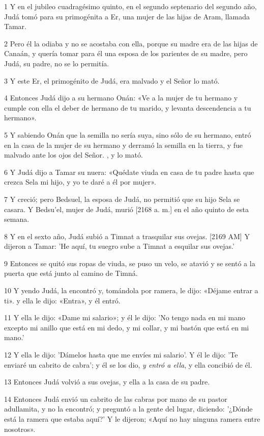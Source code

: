 \par 1 Y en el jubileo cuadragésimo quinto, en el segundo septenario del segundo año, Judá tomó para su primogénita a Er, una mujer de las hijas de Aram, llamada Tamar.
\par 2 Pero él la odiaba y no se acostaba con ella, porque su madre era de las hijas de Canaán, y quería tomar para él una esposa de los parientes de su madre, pero Judá, su padre, no se lo permitía.
\par 3 Y este Er, el primogénito de Judá, era malvado y el Señor lo mató.
\par 4 Entonces Judá dijo a su hermano Onán: «Ve a la mujer de tu hermano y cumple con ella el deber de hermano de tu marido, y levanta descendencia a tu hermano».
\par 5 Y sabiendo Onán que la semilla no sería suya, sino sólo de su hermano, entró en la casa de la mujer de su hermano y derramó la semilla en la tierra, y fue malvado ante los ojos del Señor. , y lo mató.
\par 6 Y Judá dijo a Tamar su nuera: «Quédate viuda en casa de tu padre hasta que crezca Sela mi hijo, y yo te daré a él por mujer».
\par 7 Y creció; pero Bedsuel, la esposa de Judá, no permitió que su hijo Sela se casara. Y Bedsu'el, mujer de Judá, murió [2168 a. m.] en el año quinto de esta semana.
\par 8 Y en el sexto año, Judá subió a Timnat a trasquilar sus ovejas. [2169 AM] Y dijeron a Tamar: 'He aquí, tu suegro sube a Timnat a esquilar sus ovejas.'
\par 9 Entonces se quitó sus ropas de viuda, se puso un velo, se atavió y se sentó a la puerta que está junto al camino de Timná.
\par 10 Y yendo Judá, la encontró y, tomándola por ramera, le dijo: «Déjame entrar a ti». y ella le dijo: «Entra», y él entró.
\par 11 Y ella le dijo: «Dame mi salario»; y él le dijo: 'No tengo nada en mi mano excepto mi anillo que está en mi dedo, y mi collar, y mi bastón que está en mi mano.'
\par 12 Y ella le dijo: 'Dámelos hasta que me envíes mi salario'. Y él le dijo: 'Te enviaré un cabrito de cabra'; y él se los dio, \textit{y entró a ella}, y ella concibió de él.
\par 13 Entonces Judá volvió a sus ovejas, y ella a la casa de su padre.
\par 14 Entonces Judá envió un cabrito de las cabras por mano de su pastor adullamita, y no la encontró; y preguntó a la gente del lugar, diciendo: '¿Dónde está la ramera que estaba aquí?' Y le dijeron; «Aquí no hay ninguna ramera entre nosotros».
